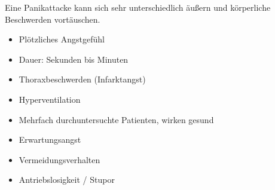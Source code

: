 Eine Panikattacke kann sich sehr unterschiedlich äußern und
körperliche Beschwerden vortäuschen.

\begin{itemize}
    \item Plötzliches Angstgefühl
    \item Dauer: Sekunden bis Minuten
    \item Thoraxbeschwerden (Infarktangst)
    \item Hyperventilation
    \item Mehrfach durchuntersuchte  Patienten, wirken gesund
    \item Erwartungsangst
    \item Vermeidungsverhalten
    \item Antriebslosigkeit / Stupor
\end{itemize}




\subsubsection{}














% 
% 
% 




